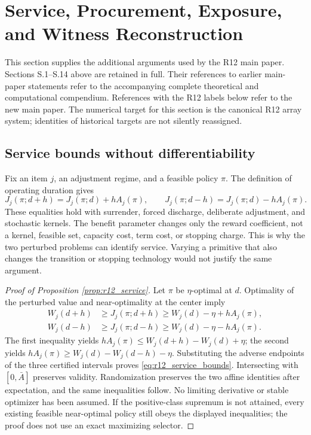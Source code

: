 \section{Service, Procurement, Exposure, and Witness Reconstruction}
\label{sec:r12_supp}
This section supplies the additional arguments used by the R12 main paper. Sections S.1--S.14 above are retained in full. Their references to earlier main-paper statements refer to the accompanying complete theoretical and computational compendium. References with the R12 labels below refer to the new main paper. The numerical target for this section is the canonical R12 array system; identities of historical targets are not silently reassigned.

\subsection{Service bounds without differentiability}
Fix an item $j$, an adjustment regime, and a feasible policy $\pi$. The definition of operating duration gives
\begin{equation}
 J_j(\pi;d+h)=J_j(\pi;d)+hA_j(\pi),\qquad
 J_j(\pi;d-h)=J_j(\pi;d)-hA_j(\pi).
\end{equation}
These equalities hold with surrender, forced discharge, deliberate adjustment, and stochastic kernels. The benefit parameter changes only the reward coefficient, not a kernel, feasible set, capacity cost, term cost, or stopping charge. This is why the two perturbed problems can identify service. Varying a primitive that also changes the transition or stopping technology would not justify the same argument.

\begin{proof}[Proof of Proposition \ref{prop:r12_service}]
Let $\pi$ be $\eta$-optimal at $d$. Optimality of the perturbed value and near-optimality at the center imply
\begin{align}
 W_j(d+h)&\geq J_j(\pi;d+h)\geq W_j(d)-\eta+hA_j(\pi),\\
 W_j(d-h)&\geq J_j(\pi;d-h)\geq W_j(d)-\eta-hA_j(\pi).
\end{align}
The first inequality yields $hA_j(\pi)\leq W_j(d+h)-W_j(d)+\eta$; the second yields $hA_j(\pi)\geq W_j(d)-W_j(d-h)-\eta$. Substituting the adverse endpoints of the three certified intervals proves \eqref{eq:r12_service_bounds}. Intersecting with $[0,\bar A]$ preserves validity. Randomization preserves the two affine identities after expectation, and the same inequalities follow. No limiting derivative or stable optimizer has been assumed. If the positive-class supremum is not attained, every existing feasible near-optimal policy still obeys the displayed inequalities; the proof does not use an exact maximizing selector.
\end{proof}

